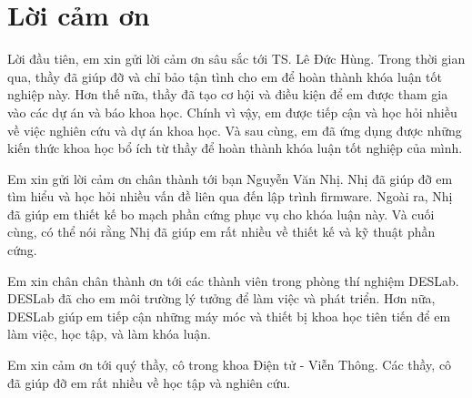 \chapter*{Lời cảm ơn}
\label{thanks}

Lời đầu tiên, em xin gửi lời cảm ơn sâu sắc tới TS. Lê Đức Hùng. Trong thời gian qua, thầy đã giúp đỡ và chỉ bảo tận tình cho em để hoàn thành khóa luận tốt nghiệp này. Hơn thế nữa, thầy đã tạo cơ hội và điều kiện để em được tham gia vào các dự án và báo khoa học. Chính vì vậy, em được tiếp cận và học hỏi nhiều về việc nghiên cứu và dự án khoa học. Và sau cùng, em đã ứng dụng được những kiến thức khoa học bổ ích từ thầy để hoàn thành khóa luận tốt nghiệp của mình.

Em xin gửi lời cảm ơn chân thành tới bạn Nguyễn Văn Nhị. Nhị đã giúp đỡ em tìm hiểu và học hỏi nhiều vấn đề liên qua đến lập trình firmware. Ngoài ra, Nhị đã giúp em thiết kế bo mạch phần cứng phục vụ cho khóa luận này. Và cuối cùng, có thể nói rằng Nhị đã giúp em rất nhiều về thiết kế và kỹ thuật phần cứng.

Em xin chân chân thành ơn tới các thành viên trong phòng thí nghiệm DESLab. DESLab đã cho em môi trường lý tưởng để làm việc và phát triển. Hơn nữa, DESLab giúp em tiếp cận những máy móc và thiết bị khoa học tiên tiến để em làm việc, học tập, và làm khóa luận.

Em xin cảm ơn tới quý thầy, cô trong khoa Điện tử - Viễn Thông. Các thầy, cô đã giúp đỡ em rất nhiều về học tập và nghiên cứu.